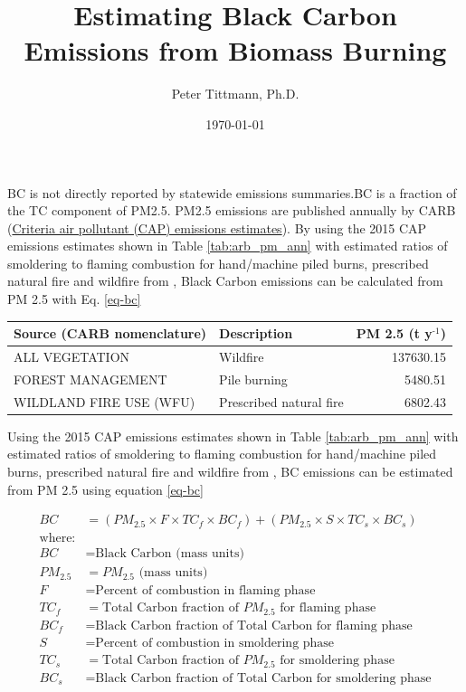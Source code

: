 \documentclass[a4paper]{article}
\author{Peter Tittmann, Ph.D.}
\date{\today}
\title{Estimating Black Carbon Emissions from Biomass Burning}
\begin{document}
\maketitle
\tableofcontents

\acf{BC} is not directly reported by statewide emissions summaries.\ac{BC} is a fraction of the \ac{TC} component of \ac{PM2.5}. \ac{PM2.5} emissions are published annually by \ac{CARB} (\href{http://www.arb.ca.gov/ei/emissiondata.htm}{Criteria air pollutant (CAP) emissions estimates}). 
By using the 2015 CAP emissions estimates shown in Table \ref{tab:arb_pm_ann} with estimated ratios of 
smoldering to flaming combustion for hand/machine piled burns, prescribed 
natural fire and wildfire from \citet{Ward1989}, Black Carbon emissions
can be calculated from PM
2.5 with Eq. \eqref{eq-bc}


\begin{center}
\begin{tabular}{llr}
Source (\ac{CARB} nomenclature) & Description & PM 2.5 (t y$^{\text{-1}}$)\\
\hline
ALL VEGETATION & Wildfire & 137630.15\\
FOREST MANAGEMENT & Pile burning & 5480.51\\
WILDLAND FIRE USE (WFU) & Prescribed natural fire & 6802.43\\
\end{tabular}
\end{center}

Using the 2015 \ac{CAP} emissions estimates shown in Table \ref{tab:arb_pm_ann} with estimated ratios of smoldering to flaming combustion for hand/machine piled burns, prescribed natural fire and wildfire from \citet{Ward1989}, \ac{BC} emissions can be estimated from PM 2.5 using equation \eqref{eq-bc}


\begin{align}
BC &= \left( PM_{2.5} \times F \times TC_f \times BC_f\right) + \left( PM_{2.5} \times S \times TC_s \times BC_s\right) \label{eq-bc} \\
\text{where:} \nonumber \\
BC &= \text{Black Carbon (mass units)} \nonumber \\
PM_{2.5} &= PM_{2.5} \text{ (mass units)} \nonumber \\
F &= \text{Percent of combustion in flaming phase} \nonumber \\
TC_f &= \text{Total Carbon fraction of } PM_{2.5} \text{ for flaming phase} \nonumber \\
BC_f &= \text{Black Carbon fraction of Total Carbon for flaming phase} \nonumber \\
S &= \text{Percent of combustion in smoldering phase} \nonumber \\
TC_s &= \text{Total Carbon fraction of } PM_{2.5} \text{ for smoldering phase} \nonumber \\
BC_s &= \text{Black Carbon fraction of Total Carbon for smoldering phase} \nonumber
\end{align}
\end{document}
